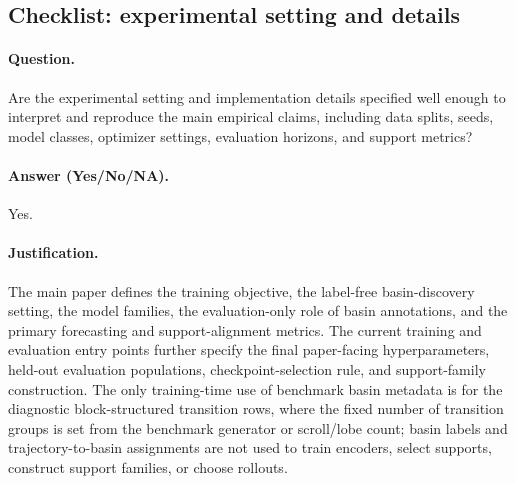 \subsection{Checklist: experimental setting and details}
\label{app:checklist_experimental_setting_details}

\paragraph{Question.}
Are the experimental setting and implementation details specified well enough to interpret and reproduce the main empirical claims, including data splits, seeds, model classes, optimizer settings, evaluation horizons, and support metrics?

\paragraph{Answer (Yes/No/NA).}
Yes.

\paragraph{Justification.}
The main paper defines the training objective, the label-free basin-discovery setting, the model families, the evaluation-only role of basin annotations, and the primary forecasting and support-alignment metrics. The current training and evaluation entry points further specify the final paper-facing hyperparameters, held-out evaluation populations, checkpoint-selection rule, and support-family construction. The only training-time use of benchmark basin metadata is for the diagnostic block-structured transition rows, where the fixed number of transition groups is set from the benchmark generator or scroll/lobe count; basin labels and trajectory-to-basin assignments are not used to train encoders, select supports, construct support families, or choose rollouts.

